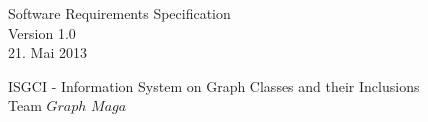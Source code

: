 \documentclass[11pt,a4paper]{article}
\begin{document}
\thispagestyle{empty} %
\vspace*{5cm} 
\begin{center}
{\huge Software Requirements Specification}\\
{\large Version 1.0}\\
{\large 21. Mai 2013}\\
\end{center}

\begin{center}
{\large ISGCI - Information System on Graph Classes and their Inclusions}\\
{\large Team $Graph$ $Maga$}
\end{center}




 
 
 
 
 \newpage
 
 \renewcommand{\contentsname}{Inhaltsverzeichnis}
 \tableofcontents %
 
 \newpage
 
 
 
 
\end{document}
